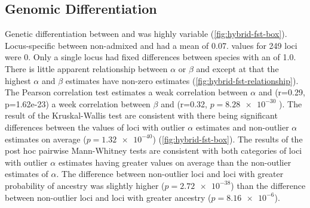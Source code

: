 \subsection{Genomic Differentiation}
Genetic differentiation between \amer and \terr was highly variable (\cref{fig:hybrid-fst-box}). 
Locus-specific \fst between non-admixed \amer and \terr had a mean 
of 0.07. \fst values for 249 loci were 0. Only a single locus had fixed 
differences between species with an \fst of 1.0. 
There is little apparent relationship between $\alpha$ or $\beta$ and \fst 
except at that the highest $\alpha$ and $\beta$ estimates have non-zero \fst estimates (\cref{fig:hybrid-fst-relationship}).
The Pearson correlation test estimates a weak correlation between $\alpha$ and
\fst (r=0.29, p=1.62e-23) a week correlation between $\beta$ and \fst 
(r=0.32, $p=\num{8.28e-30}$ ). 
The result of the Kruskal-Wallis test are consistent with there being significant 
differences between the \fst values of loci with outlier $\alpha$ estimates
and non-outlier $\alpha$ estimates on average ($p=\num{1.32e-40}$) (\cref{fig:hybrid-fst-box}).
The results of the post hoc pairwise Mann-Whitney tests are consistent with 
both categories of loci with outlier $\alpha$ estimates  having greater \fst 
values on average than the non-outlier estimates of  $\alpha$.
The difference between non-outlier loci and loci with greater probability of
\amer ancestry was slightly higher ($p=\num{2.72e-38}$) than the difference between 
non-outlier loci and loci with greater \terr ancestry ($p=\num{8.16e-6}$).




